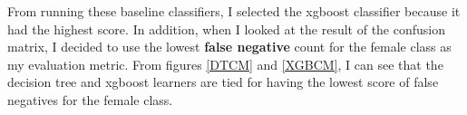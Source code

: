 From running these baseline classifiers, I selected the xgboost classifier because it had the highest score. In addition, when I looked at the result of the confusion matrix, I decided to use the lowest \textbf{false negative} count for the female class as my evaluation metric. From figures \ref{DTCM} and \ref{XGBCM}, I can see that the decision tree and xgboost learners are tied for having the lowest score of false negatives for the female class.
\begin{figure}[!hbtp]
\centering

    \quad



\end{figure}
